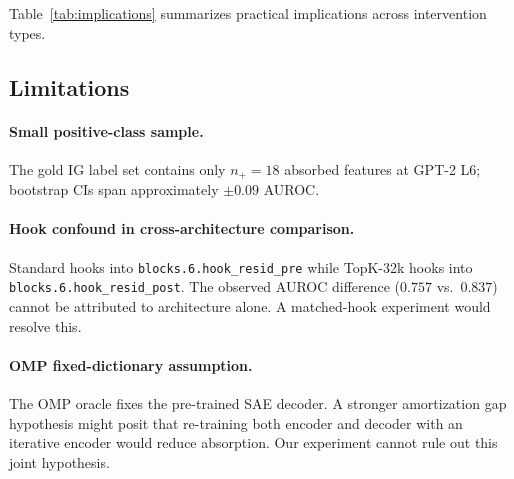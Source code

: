 \documentclass{article}
\begin{document}
Table~\ref{tab:implications} summarizes practical implications across intervention types.

\begin{table}[t]
\centering
\caption{Implications for SAE mitigation approaches.}
\label{tab:implications}
\end{table}

\subsection{Limitations}

\paragraph{Small positive-class sample.} The gold IG label set contains only $n_+=18$
absorbed features at GPT-2 L6; bootstrap CIs span approximately $\pm 0.09$ AUROC.

\paragraph{Hook confound in cross-architecture comparison.} Standard hooks into
\texttt{blocks.6.hook\_resid\_pre} while TopK-32k hooks into
\texttt{blocks.6.hook\_resid\_post}. The observed AUROC difference ($0.757$ vs.\ $0.837$)
cannot be attributed to architecture alone. A matched-hook experiment would resolve this.

\paragraph{OMP fixed-dictionary assumption.} The OMP oracle fixes the pre-trained SAE
decoder. A stronger amortization gap hypothesis might posit that re-training both encoder and
decoder with an iterative encoder would reduce absorption. Our experiment cannot rule out this
joint hypothesis.
\end{document}
